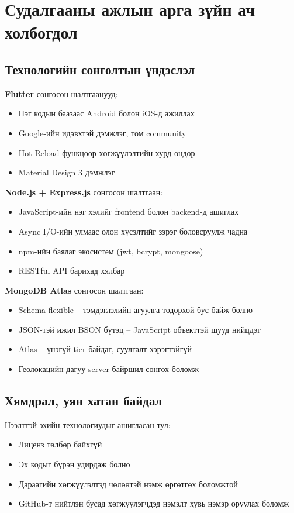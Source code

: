 \section{Судалгааны ажлын арга зүйн ач холбогдол}

\subsection{Технологийн сонголтын үндэслэл}

\textbf{Flutter} сонгосон шалтгаанууд:
\begin{itemize}
  \item Нэг кодын баазаас Android болон iOS-д ажиллах
  \item Google-ийн идэвхтэй дэмжлэг, том community
  \item Hot Reload функцоор хөгжүүлэлтийн хурд өндөр
  \item Material Design 3 дэмжлэг
\end{itemize}

\textbf{Node.js + Express.js} сонгосон шалтгаан:
\begin{itemize}
  \item JavaScript-ийн нэг хэлийг frontend болон backend-д ашиглах
  \item Async I/O-ийн улмаас олон хүсэлтийг зэрэг боловсруулж чадна
  \item npm-ийн баялаг экосистем (jwt, bcrypt, mongoose)
  \item RESTful API барихад хялбар
\end{itemize}

\textbf{MongoDB Atlas} сонгосон шалтгаан:
\begin{itemize}
  \item Schema-flexible -- тэмдэглэлийн агуулга тодорхой бус байж болно
  \item JSON-тэй ижил BSON бүтэц -- JavaScript объекттэй шууд нийцдэг
  \item Atlas -- үнэгүй tier байдаг, суулгалт хэрэгтэйгүй
  \item Геолокацийн дагуу server байршил сонгох боломж
\end{itemize}

\subsection{Хямдрал, уян хатан байдал}

Нээлттэй эхийн технологиудыг ашигласан тул:
\begin{itemize}
  \item Лиценз төлбөр байхгүй
  \item Эх кодыг бүрэн удирдаж болно
  \item Дараагийн хөгжүүлэлтэд чөлөөтэй нэмж өргөтгөх боломжтой
  \item GitHub-т нийтлэн бусад хөгжүүлэгчдэд нэмэлт хувь нэмэр оруулах боломж
\end{itemize}

